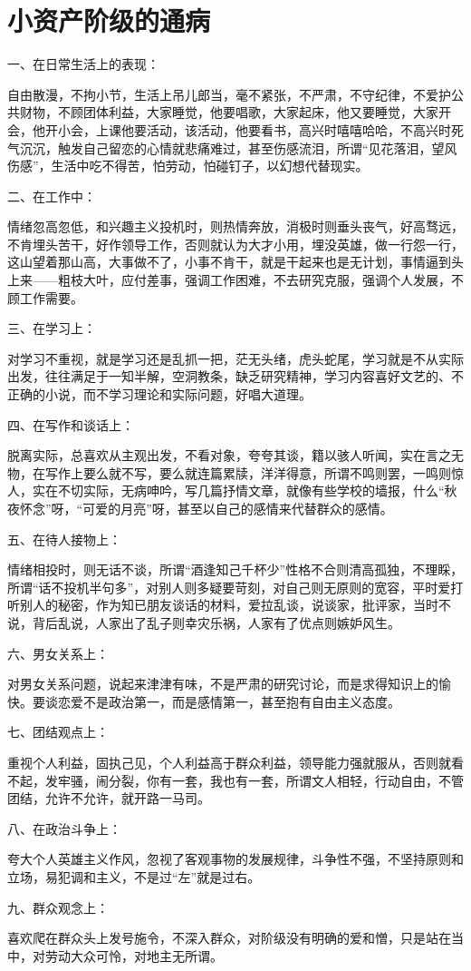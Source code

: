 \section[小资产阶级的通病 ]{小资产阶级的通病 }


一、在日常生活上的表现：

自由散漫，不拘小节，生活上吊儿郎当，毫不紧张，不严肃，不守纪律，不爱护公共财物，不顾团体利益，大家睡觉，他要唱歌，大家起床，他又要睡觉，大家开会，他开小会，上课他要活动，该活动，他要看书，高兴时嘻嘻哈哈，不高兴时死气沉沉，触发自己留恋的心情就悲痛难过，甚至伤感流泪，所谓“见花落泪，望风伤感”，生活中吃不得苦，怕劳动，怕碰钉子，以幻想代替现实。

二、在工作中：

情绪忽高忽低，和兴趣主义投机时，则热情奔放，消极时则垂头丧气，好高骛远，不肯埋头苦干，好作领导工作，否则就认为大才小用，埋没英雄，做一行怨一行，这山望着那山高，大事做不了，小事不肯干，就是干起来也是无计划，事情逼到头上来——粗枝大叶，应付差事，强调工作困难，不去研究克服，强调个人发展，不顾工作需要。

三、在学习上：

对学习不重视，就是学习还是乱抓一把，茫无头绪，虎头蛇尾，学习就是不从实际出发，往往满足于一知半解，空洞教条，缺乏研究精神，学习内容喜好文艺的、不正确的小说，而不学习理论和实际问题，好唱大道理。

四、在写作和谈话上：

脱离实际，总喜欢从主观出发，不看对象，夸夸其谈，籍以骇人听闻，实在言之无物，在写作上要么就不写，要么就连篇累牍，洋洋得意，所谓不鸣则罢，一鸣则惊人，实在不切实际，无病呻吟，写几篇抒情文章，就像有些学校的墙报，什么“秋夜怀念”呀，“可爱的月亮”呀，甚至以自己的感情来代替群众的感情。

五、在待人接物上：

情绪相投时，则无话不谈，所谓“酒逢知己千杯少”性格不合则清高孤独，不理睬，所谓“话不投机半句多”，对别人则多疑要苛刻，对自己则无原则的宽容，平时爱打听别人的秘密，作为知已朋友谈话的材料，爱拉乱谈，说谈家，批评家，当时不说，背后乱说，人家出了乱子则幸灾乐祸，人家有了优点则嫉妒风生。

六、男女关系上：

对男女关系问题，说起来津津有味，不是严肃的研究讨论，而是求得知识上的愉快。要谈恋爱不是政治第一，而是感情第一，甚至抱有自由主义态度。

七、团结观点上：

重视个人利益，固执己见，个人利益高于群众利益，领导能力强就服从，否则就看不起，发牢骚，闹分裂，你有一套，我也有一套，所谓文人相轻，行动自由，不管团结，允许不允许，就开路一马司。

八、在政治斗争上：

夸大个人英雄主义作风，忽视了客观事物的发展规律，斗争性不强，不坚持原则和立场，易犯调和主义，不是过“左”就是过右。

九、群众观念上：

喜欢爬在群众头上发号施令，不深入群众，对阶级没有明确的爱和憎，只是站在当中，对劳动大众可怜，对地主无所谓。


